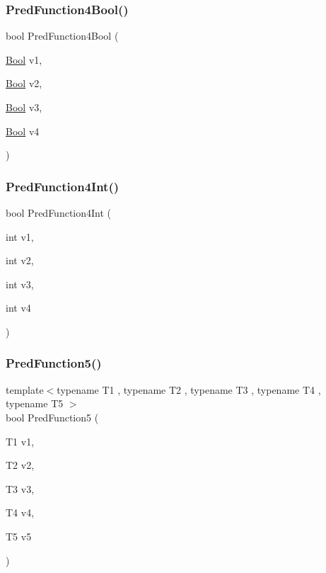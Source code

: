 \subsubsection{\texorpdfstring{PredFunction4Bool()}{PredFunction4Bool()}}
{\footnotesize\ttfamily bool Pred\+Function4\+Bool (\begin{DoxyParamCaption}\item[{\mbox{\hyperlink{struct_bool}{Bool}}}]{v1,  }\item[{\mbox{\hyperlink{struct_bool}{Bool}}}]{v2,  }\item[{\mbox{\hyperlink{struct_bool}{Bool}}}]{v3,  }\item[{\mbox{\hyperlink{struct_bool}{Bool}}}]{v4 }\end{DoxyParamCaption})}

\mbox{\label{_obj__test_2lib_2googletest-master_2googletest_2test_2gtest__pred__impl__unittest_8cc_a105a045112a34fb2b65360c0d5daf81e}} 
\subsubsection{\texorpdfstring{PredFunction4Int()}{PredFunction4Int()}}
{\footnotesize\ttfamily bool Pred\+Function4\+Int (\begin{DoxyParamCaption}\item[{int}]{v1,  }\item[{int}]{v2,  }\item[{int}]{v3,  }\item[{int}]{v4 }\end{DoxyParamCaption})}

\mbox{\label{_obj__test_2lib_2googletest-master_2googletest_2test_2gtest__pred__impl__unittest_8cc_aacb9302c548682f154ddf1a02a23a99f}} 
\subsubsection{\texorpdfstring{PredFunction5()}{PredFunction5()}}
{\footnotesize\ttfamily template$<$typename T1 , typename T2 , typename T3 , typename T4 , typename T5 $>$ \\
bool Pred\+Function5 (\begin{DoxyParamCaption}\item[{T1}]{v1,  }\item[{T2}]{v2,  }\item[{T3}]{v3,  }\item[{T4}]{v4,  }\item[{T5}]{v5 }\end{DoxyParamCaption})}

